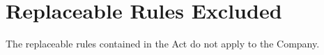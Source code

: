 \section{Replaceable Rules Excluded}

The replaceable rules contained in the Act do not apply to the Company. 